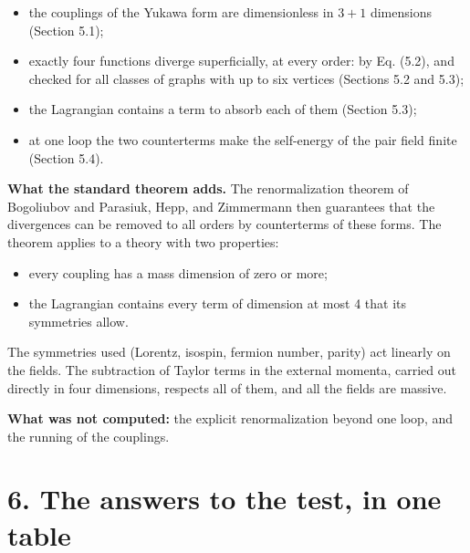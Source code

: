 \documentclass[
  10pt,
]{article}
\providecommand{\tightlist}{%
  \setlength{\itemsep}{0pt}\setlength{\parskip}{0pt}}
\begin{document}
\begin{itemize}
\tightlist
\item
  the couplings of the Yukawa form are dimensionless in \(3+1\)
  dimensions (Section 5.1);
\item
  exactly four functions diverge superficially, at every order: by Eq.
  (5.2), and checked for all classes of graphs with up to six vertices
  (Sections 5.2 and 5.3);
\item
  the Lagrangian contains a term to absorb each of them (Section 5.3);
\item
  at one loop the two counterterms make the self-energy of the pair
  field finite (Section 5.4).
\end{itemize}

\textbf{What the standard theorem adds.} The renormalization theorem of
Bogoliubov and Parasiuk, Hepp, and Zimmermann then guarantees that the
divergences can be removed to all orders by counterterms of these forms.
The theorem applies to a theory with two properties:

\begin{itemize}
\tightlist
\item
  every coupling has a mass dimension of zero or more;
\item
  the Lagrangian contains every term of dimension at most 4 that its
  symmetries allow.
\end{itemize}

The symmetries used (Lorentz, isospin, fermion number, parity) act
linearly on the fields. The subtraction of Taylor terms in the external
momenta, carried out directly in four dimensions, respects all of them,
and all the fields are massive.

\textbf{What was not computed:} the explicit renormalization beyond one
loop, and the running of the couplings.

\hypertarget{the-answers-to-the-test-in-one-table}{%
\section{6. The answers to the test, in one
table}\label{the-answers-to-the-test-in-one-table}}
\end{document}
